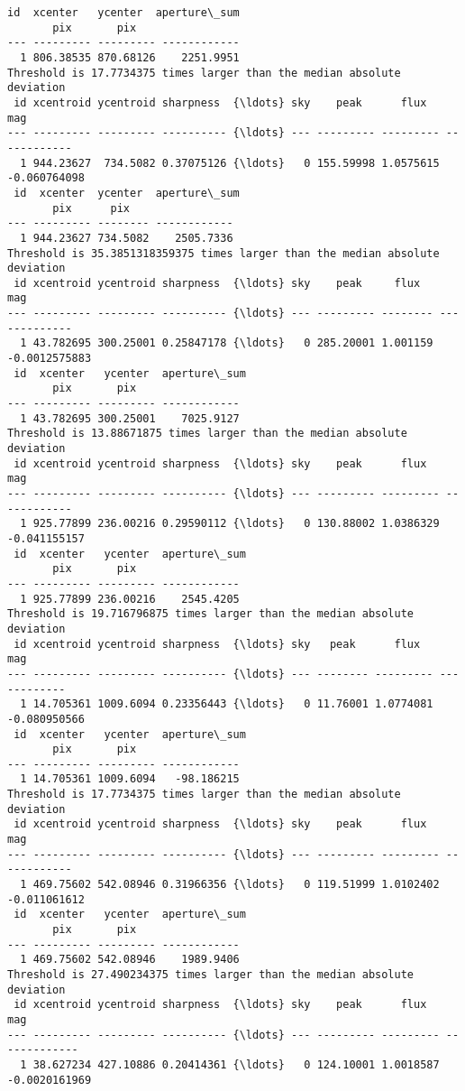 \documentclass[11pt]{article}
\begin{document}
\begin{Verbatim}[commandchars=\\\{\}]
 id  xcenter   ycenter  aperture\_sum
       pix       pix
--- --------- --------- ------------
  1 806.38535 870.68126    2251.9951
Threshold is 17.7734375 times larger than the median absolute deviation
 id xcentroid ycentroid sharpness  {\ldots} sky    peak      flux       mag
--- --------- --------- ---------- {\ldots} --- --------- --------- ------------
  1 944.23627  734.5082 0.37075126 {\ldots}   0 155.59998 1.0575615 -0.060764098
 id  xcenter  ycenter  aperture\_sum
       pix      pix
--- --------- -------- ------------
  1 944.23627 734.5082    2505.7336
Threshold is 35.3851318359375 times larger than the median absolute deviation
 id xcentroid ycentroid sharpness  {\ldots} sky    peak     flux        mag
--- --------- --------- ---------- {\ldots} --- --------- -------- -------------
  1 43.782695 300.25001 0.25847178 {\ldots}   0 285.20001 1.001159 -0.0012575883
 id  xcenter   ycenter  aperture\_sum
       pix       pix
--- --------- --------- ------------
  1 43.782695 300.25001    7025.9127
Threshold is 13.88671875 times larger than the median absolute deviation
 id xcentroid ycentroid sharpness  {\ldots} sky    peak      flux       mag
--- --------- --------- ---------- {\ldots} --- --------- --------- ------------
  1 925.77899 236.00216 0.29590112 {\ldots}   0 130.88002 1.0386329 -0.041155157
 id  xcenter   ycenter  aperture\_sum
       pix       pix
--- --------- --------- ------------
  1 925.77899 236.00216    2545.4205
Threshold is 19.716796875 times larger than the median absolute deviation
 id xcentroid ycentroid sharpness  {\ldots} sky   peak      flux       mag
--- --------- --------- ---------- {\ldots} --- -------- --------- ------------
  1 14.705361 1009.6094 0.23356443 {\ldots}   0 11.76001 1.0774081 -0.080950566
 id  xcenter   ycenter  aperture\_sum
       pix       pix
--- --------- --------- ------------
  1 14.705361 1009.6094   -98.186215
Threshold is 17.7734375 times larger than the median absolute deviation
 id xcentroid ycentroid sharpness  {\ldots} sky    peak      flux       mag
--- --------- --------- ---------- {\ldots} --- --------- --------- ------------
  1 469.75602 542.08946 0.31966356 {\ldots}   0 119.51999 1.0102402 -0.011061612
 id  xcenter   ycenter  aperture\_sum
       pix       pix
--- --------- --------- ------------
  1 469.75602 542.08946    1989.9406
Threshold is 27.490234375 times larger than the median absolute deviation
 id xcentroid ycentroid sharpness  {\ldots} sky    peak      flux        mag
--- --------- --------- ---------- {\ldots} --- --------- --------- -------------
  1 38.627234 427.10886 0.20414361 {\ldots}   0 124.10001 1.0018587 -0.0020161969

\end{Verbatim}
\end{document}
